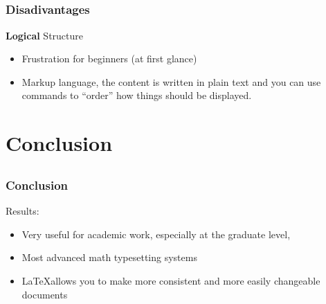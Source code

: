 \documentclass{beamer}
\begin{document}
\subsection*{}

\begin{frame}
	\frametitle<presentation>{Disadivantages}
\begin{block}{\textbf{Logical} Structure}
\begin{itemize}
\item Frustration for beginners (at first glance)
 \item Markup language, the content is written in plain text and you can use commands to “order” how things should be displayed.
  
  
\end{itemize}
\end{block}
\end{frame}



\section{Conclusion}

\subsection*{}

\begin{frame}
	\frametitle<presentation>{Conclusion}
	\begin{block}{Results:}
	  \begin{itemize}
	  	\item Very useful for academic work, especially at the graduate level,
	  	\item Most advanced math typesetting systems
	  	\item \LaTeX allows you to make more consistent and more easily changeable documents
		\end{itemize}
	\end{block}
\end{frame}
\end{document}
